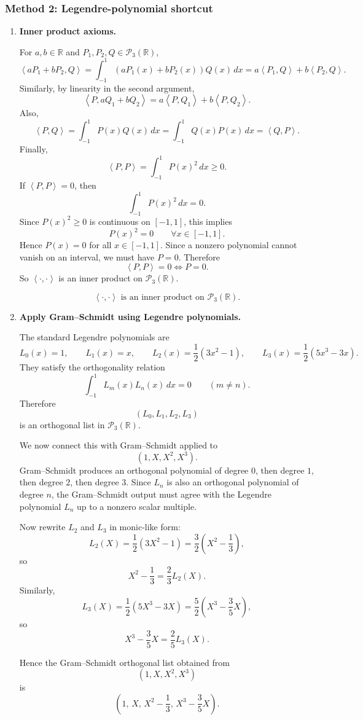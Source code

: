 \documentclass[12pt]{article}
\newcommand{\R}{\mathbb{R}}
\newcommand{\cP}{\mathcal{P}}
\newcommand{\ip}[2]{\left\langle #1,#2\right\rangle}
\begin{document}
\subsubsection{Method 2: Legendre-polynomial shortcut}
\begin{enumerate}[label=(\alph*)]
\item \textbf{Inner product axioms.}


For \(a,b\in\R\) and \(P_1,P_2,Q\in\cP_3(\R)\),
\[
\ip{aP_1+bP_2}{Q}
=\int_{-1}^{1}(aP_1(x)+bP_2(x))Q(x)\,dx
=a\ip{P_1}{Q}+b\ip{P_2}{Q}.
\]
Similarly, by linearity in the second argument,
\[
\ip{P}{aQ_1+bQ_2}
=a\ip{P}{Q_1}+b\ip{P}{Q_2}.
\]
Also,
\[
\ip{P}{Q}
=\int_{-1}^{1}P(x)Q(x)\,dx
=\int_{-1}^{1}Q(x)P(x)\,dx
=\ip{Q}{P}.
\]
Finally,
\[
\ip{P}{P}
=\int_{-1}^{1}P(x)^2\,dx\ge 0.
\]
If \(\ip{P}{P}=0\), then
\[
\int_{-1}^{1}P(x)^2\,dx=0.
\]
Since \(P(x)^2\ge 0\) is continuous on \([-1,1]\), this implies
\[
P(x)^2=0
\qquad\forall x\in[-1,1].
\]
Hence \(P(x)=0\) for all \(x\in[-1,1]\). Since a nonzero polynomial cannot vanish on an interval, we must have \(P=0\). Therefore
\[
\ip{P}{P}=0 \iff P=0.
\]
So \(\ip{\cdot}{\cdot}\) is an inner product on \(\cP_3(\R)\).

\[
\boxed{\ip{\cdot}{\cdot}\text{ is an inner product on }\cP_3(\R).}
\]

\item \textbf{Apply Gram--Schmidt using Legendre polynomials.}

The standard Legendre polynomials are
\[
L_0(x)=1,\qquad
L_1(x)=x,\qquad
L_2(x)=\frac12(3x^2-1),\qquad
L_3(x)=\frac12(5x^3-3x).
\]
They satisfy the orthogonality relation
\[
\int_{-1}^{1}L_m(x)L_n(x)\,dx=0
\qquad(m\neq n).
\]
Therefore
\[
(L_0,L_1,L_2,L_3)
\]
is an orthogonal list in \(\cP_3(\R)\).

We now connect this with Gram--Schmidt applied to
\[
(1,X,X^2,X^3).
\]
Gram--Schmidt produces an orthogonal polynomial of degree \(0\), then degree \(1\), then degree \(2\), then degree \(3\). Since \(L_n\) is also an orthogonal polynomial of degree \(n\), the Gram--Schmidt output must agree with the Legendre polynomial \(L_n\) up to a nonzero scalar multiple.

Now rewrite \(L_2\) and \(L_3\) in monic-like form:
\[
L_2(X)=\frac12(3X^2-1)
=\frac32\left(X^2-\frac13\right),
\]
so
\[
X^2-\frac13=\frac23L_2(X).
\]
Similarly,
\[
L_3(X)=\frac12(5X^3-3X)
=\frac52\left(X^3-\frac35X\right),
\]
so
\[
X^3-\frac35X=\frac25L_3(X).
\]

Hence the Gram--Schmidt orthogonal list obtained from
\[
(1,X,X^2,X^3)
\]
is
\[
\boxed{
\left(
1,\,
X,\,
X^2-\frac13,\,
X^3-\frac35X
\right).
}
\]


\end{enumerate}
\end{document}
